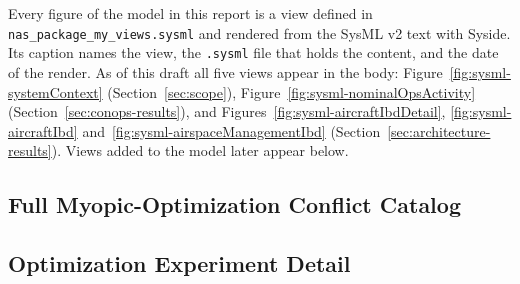 Every figure of the model in this report is a view defined in \texttt{nas\_package\_my\_views.sysml} and rendered from the SysML v2 text with Syside. Its caption names the view, the \texttt{.sysml} file that holds the content, and the date of the render. As of this draft all five views appear in the body: Figure~\ref{fig:sysml-systemContext} (Section~\ref{sec:scope}), Figure~\ref{fig:sysml-nominalOpsActivity} (Section~\ref{sec:conops-results}), and Figures~\ref{fig:sysml-aircraftIbdDetail}, \ref{fig:sysml-aircraftIbd} and~\ref{fig:sysml-airspaceManagementIbd} (Section~\ref{sec:architecture-results}). Views added to the model later appear below.



\subsection{Full Myopic-Optimization Conflict Catalog}
\label{app:myopic}

\subsection{Optimization Experiment Detail}
\label{app:optimization}


